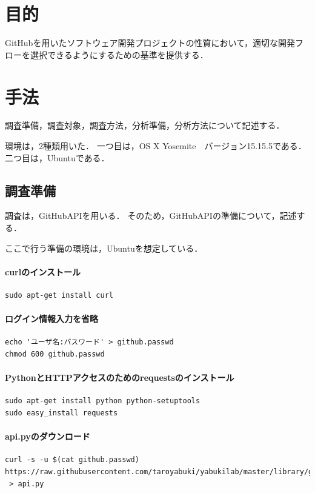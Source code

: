 \chapter{目的}


GitHubを用いたソフトウェア開発プロジェクトの性質において，適切な開発フローを選択できるようにするための基準を提供する．








\chapter{手法}
調査準備，調査対象，調査方法，分析準備，分析方法について記述する．

環境は，2種類用いた．
一つ目は，OS X Yosemite　バージョン15.15.5である．
二つ目は，Ubuntuである．

\section{調査準備}
調査は，GitHubAPIを用いる．
そのため，GitHubAPIの準備について，記述する．

ここで行う準備の環境は，Ubuntuを想定している．
\subsubsection{curlのインストール}
{
\small
\begin{verbatim}
sudo apt-get install curl
\end{verbatim}
}
\subsubsection{ログイン情報入力を省略}
{
\small
\begin{verbatim}
echo 'ユーザ名:パスワード' > github.passwd
chmod 600 github.passwd
\end{verbatim}
}
\subsubsection{PythonとHTTPアクセスのためのrequestsのインストール}
{
\small
\begin{verbatim}
sudo apt-get install python python-setuptools
sudo easy_install requests
\end{verbatim}
}


\subsubsection{api.pyのダウンロード}
{
\small
\begin{verbatim}
curl -s -u $(cat github.passwd) 
https://raw.githubusercontent.com/taroyabuki/yabukilab/master/library/github/api.py
 > api.py
\end{verbatim}
}
